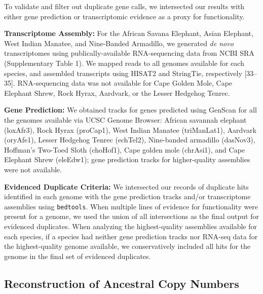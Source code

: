 \documentclass[]{elsarticle} %
\begin{document}
To validate and filter out duplicate gene calls, we intersected our
results with either gene prediction or transcriptomic evidence as a
proxy for functionality.

\textbf{Transcriptome Assembly:} For the African Savana Elephant, Asian
Elephant, West Indian Manatee, and Nine-Banded Armadillo, we generated
\emph{de novo} transcriptomes using publically-available RNA-sequencing
data from NCBI SRA (Supplementary Table 1). We mapped reads to all
genomes available for each species, and assembled transcripts using
HISAT2 and StringTie, respectively {[}33--35{]}. RNA-sequencing data was
not available for Cape Golden Mole, Cape Elephant Shrew, Rock Hyrax,
Aardvark, or the Lesser Hedgehog Tenrec.

\textbf{Gene Prediction:} We obtained tracks for genes predicted using
GenScan for all the genomes available via UCSC Genome Browser: African
savannah elephant (loxAfr3), Rock Hyrax (proCap1), West Indian Manatee
(triManLat1), Aardvark (oryAfe1), Lesser Hedgehog Tenrec (echTel2),
Nine-banded armadillo (dasNov3), Hoffman's Two-Toed Sloth (choHof1),
Cape golden mole (chrAsi1), and Cape Elephant Shrew (eleEdw1); gene
prediction tracks for higher-quality assemblies were not available.

\textbf{Evidenced Duplicate Criteria:} We intersected our records of
duplicate hits identified in each genome with the gene prediction tracks
and/or transcriptome assemblies using \texttt{bedtools}. When multiple
lines of evidence for functionality were present for a genome, we used
the union of all intersections as the final output for evidenced
duplicates. When analyzing the highest-quality assemblies available for
each species, if a species had neither gene prediction tracks nor
RNA-seq data for the highest-quality genome available, we conservatively
included all hits for the genome in the final set of evidenced
duplicates.

\hypertarget{reconstruction-of-ancestral-copy-numbers}{%
\subsection{Reconstruction of Ancestral Copy
Numbers}\label{reconstruction-of-ancestral-copy-numbers}}
\end{document}
